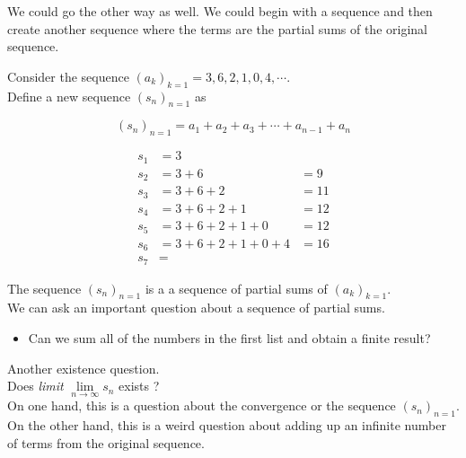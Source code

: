 \documentclass{ximera}
\begin{document}
We could go the other way as well.  We could begin with a sequence and then create another sequence where the terms are the partial sums of the original sequence.








\begin{example}


Consider the sequence $(a_k)_{k=1} = 3, 6, 2, 1, 0, 4, \cdots$. \\

Define a new sequence $(s_n)_{n=1}$ as 


\[
(s_n)_{n=1} = a_1 + a_2 + a_3 + \cdots + a_{n-1} + a_n
\]





\begin{align*}
s_1 & = 3 \\
s_2 & = 3 + 6 & = 9 \\
s_3 & = 3 + 6 + 2 & = 11 \\
s_4 & = 3 + 6 + 2 + 1 & = 12 \\
s_5 & = 3 + 6 + 2 + 1 + 0 & = 12 \\
s_6 & = 3 + 6 + 2 + 1 + 0 + 4 & = 16 \\
s_7 & = 
\end{align*}



\end{example}


The sequence $(s_n)_{n=1}$ is a a sequence of partial sums of $(a_k)_{k=1}$. \\




We can ask an important question about a sequence of partial sums.

\begin{itemize}
\item Can we sum all of the numbers in the first list and obtain a finite result?
\end{itemize}



Another existence question. \\

Does \emph{limit} $\lim\limits_{n \to \infty} s_n$ exists ? \\


On one hand, this is a question about the convergence or the sequence $(s_n)_{n=1}$.  On the other hand, this is a weird question about adding up an infinite number of terms from the original sequence. \\
\end{document}
